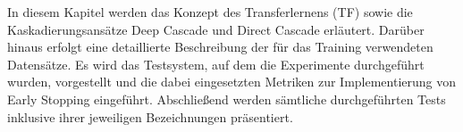 In diesem Kapitel werden das Konzept des Transferlernens (TF) sowie die Kaskadierungsansätze Deep Cascade und Direct Cascade erläutert. 
Darüber hinaus erfolgt eine detaillierte Beschreibung der für das Training verwendeten Datensätze. Es wird das Testsystem, auf dem die 
Experimente durchgeführt wurden, vorgestellt und die dabei eingesetzten Metriken zur Implementierung von Early Stopping eingeführt. Abschließend 
werden sämtliche durchgeführten Tests inklusive ihrer jeweiligen Bezeichnungen präsentiert. 

